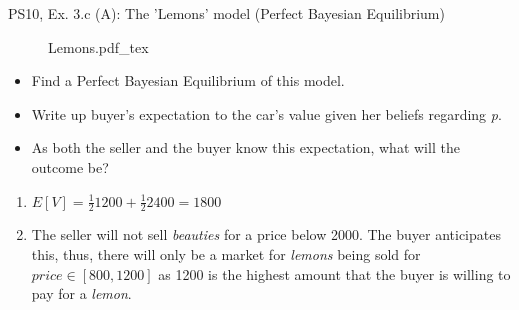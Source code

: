 \begin{frame}{PS10, Ex. 3.c (A): The 'Lemons' model (Perfect Bayesian Equilibrium)}
    \begin{figure}[!h]
      \center {}
      {Lemons.pdf_tex}
    \end{figure}
    \vspace{-8pt}
    \begin{itemize}
      \item[(c)] Find a Perfect Bayesian Equilibrium of this model.
    \end{itemize}
    \vspace{-8pt}
    \begin{multicols}{2}
      \begin{itemize}
        \item[Step 1:] Write up buyer's expectation to the car's value given her beliefs regarding \textit{p}.
        \item[Step 2:] As both the seller and the buyer know this expectation, what will the outcome be?
      \end{itemize}
      \vfill\null\columnbreak
      \begin{enumerate}
        \item $E[V]=\frac{1}{2}1200+\frac{1}{2}2400=1800$
        \item The seller will not sell \textit{beauties} for a price below 2000. The buyer anticipates this, thus, there will only be a market for \textit{lemons} being sold for $price\in[800,1200]$ as 1200 is the highest amount that the buyer is willing to pay for a \textit{lemon}.
      \end{enumerate}
      \vfill\null
    \end{multicols}
\end{frame}
